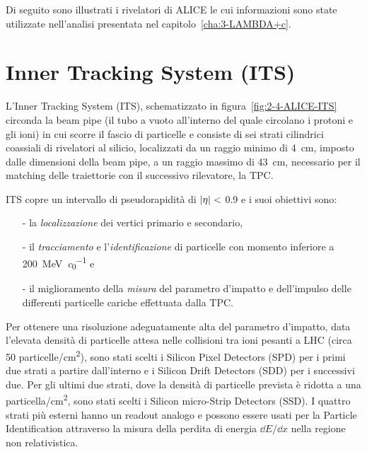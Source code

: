         Di seguito sono illustrati i rivelatori di ALICE le cui informazioni sono state utilizzate nell’analisi presentata nel capitolo~\ref{cha:3-LAMBDA+c}.

\section{Inner Tracking System (ITS)}
    L’Inner Tracking System (ITS), schematizzato in figura~\ref{fig:2-4-ALICE-ITS} circonda la beam pipe (il tubo a vuoto all'interno del quale circolano i protoni e gli ioni) in cui scorre il fascio di particelle e consiste di sei strati cilindrici coassiali di rivelatori al silicio, localizzati da un raggio minimo di \qty{4}{\centi \meter}, imposto dalle dimensioni della beam pipe, a un raggio massimo di \qty{43}{\centi \meter}, necessario per il matching delle traiettorie con il successivo rilevatore, la TPC.
    
    ITS copre un intervallo di pseudorapidità di $\abs{\eta} <$ \num{0.9} e i suoi obiettivi sono:
    \begin{itemize}
        \item[-] la \textit{localizzazione} dei vertici primario e secondario,

        \item[-] il \textit{tracciamento} e l’\textit{identificazione} di particelle con momento inferiore a \qty[per-mode = symbol]{200}{\mega \eV \per \clight} e

        \item[-] il miglioramento della \textit{misura} del parametro d’impatto e dell’impulso delle differenti particelle cariche effettuata dalla TPC.
    \end{itemize}
    
    Per ottenere una risoluzione adeguatamente alta del parametro d’impatto, data l’elevata densità di particelle attesa nelle collisioni tra ioni pesanti a LHC (circa \num{50} particelle/\unit{\centi \meter^2}), sono stati scelti i Silicon Pixel Detectors (SPD) per i primi due strati a partire dall’interno e i Silicon Drift Detectors (SDD) per i successivi due. Per gli ultimi due strati, dove la densità di particelle prevista è ridotta a una particella/\unit{\centi \meter^2}, sono stati scelti i Silicon micro-Strip Detectors (SSD). I quattro strati più esterni hanno un readout analogo e possono essere usati per la Particle Identification attraverso la misura della perdita di energia $\dd{E}\!/\!\dd{x}$ nella regione non relativistica.

